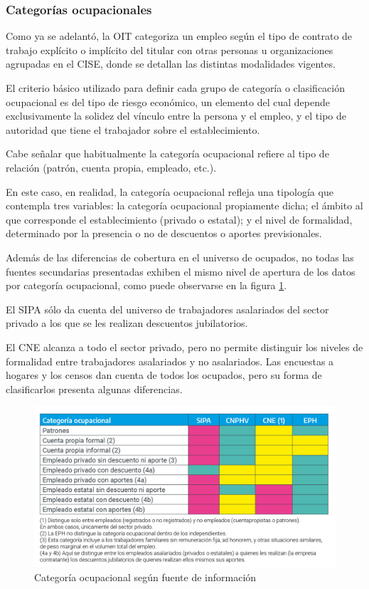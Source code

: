 \documentclass[
  openany]{book}
\begin{document}
\hypertarget{categoruxedas-ocupacionales}{%
\subsubsection{Categorías ocupacionales}\label{categoruxedas-ocupacionales}}

Como ya se adelantó, la OIT categoriza un empleo según el tipo de contrato de trabajo explícito o implícito del titular con otras personas u organizaciones agrupadas en el CISE, donde se detallan las distintas modalidades vigentes.

El criterio básico utilizado para definir cada grupo de categoría o clasificación ocupacional es del tipo de riesgo económico, un elemento del cual depende exclusivamente la solidez del vínculo entre la persona y el empleo, y el tipo de autoridad que tiene el trabajador sobre el establecimiento.

Cabe señalar que habitualmente la categoría ocupacional refiere al tipo de relación (patrón, cuenta propia, empleado, etc.).

En este caso, en realidad, la categoría ocupacional refleja una tipología que contempla tres variables: la categoría ocupacional propiamente dicha; el ámbito al que corresponde el establecimiento (privado o estatal); y el nivel de formalidad, determinado por la presencia o no de descuentos o aportes previsionales.

Además de las diferencias de cobertura en el universo de ocupados, no todas las fuentes secundarias presentadas exhiben el mismo nivel de apertura de los datos por categoría ocupacional, como puede observarse en la figura \ref{fig:empleofuentes3}.

El SIPA sólo da cuenta del universo de trabajadores asalariados del sector privado a los que se les realizan descuentos jubilatorios.

El CNE alcanza a todo el sector privado, pero no permite distinguir los niveles de formalidad entre trabajadores asalariados y no asalariados.
Las encuestas a hogares y los censos dan cuenta de todos los ocupados, pero su forma de clasificarlos presenta algunas diferencias.

\begin{figure}

{\centering \includegraphics[width=1\linewidth]{imagenes/figura3.3} 

}

\caption{Categoría ocupacional según fuente de información}\label{fig:empleofuentes3}
\end{figure}
\end{document}
